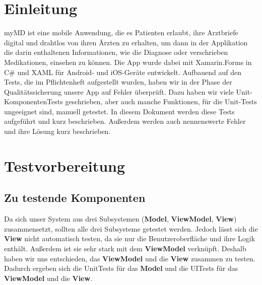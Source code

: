 \documentclass[a4paper]{scrreprt}
\begin{document}
\chapter{Einleitung}
\dq{}myMD\dq{} ist eine mobile Anwendung, die es Patienten erlaubt, ihre Arztbriefe digital und drahtlos von ihren Ärzten zu erhalten, um dann in der Applikation die darin enthaltenen Informationen, wie die Diagnose oder verschrieben Medikationen, einsehen zu können. \newline
\newline
Die App wurde dabei mit Xamarin.Forms in C\# und XAML für Android- und iOS-Geräte entwickelt. 
\newline
\newline
Aufbauend auf den Tests, die im Pflichtenheft aufgestellt wurden, haben wir in der Phase der Qualitätssicherung unsere App auf Fehler überprüft. Dazu haben wir viele Unit-KomponentenTests geschrieben, aber auch manche Funktionen, für die Unit-Tests ungeeignet sind, manuell getestet.
\newline
\newline
In diesem Dokument werden diese Tests aufgeführt und kurz beschrieben. Außerdem werden auch nennenswerte Fehler und ihre Lösung kurz beschrieben.
\chapter{Testvorbereitung}
\section{Zu testende Komponenten}
Da sich unser System aus drei Subsystemen (\textbf{Model}, \textbf{ViewModel}, \textbf{View}) zusammensetzt, sollten alle drei Subsysteme getestet werden. Jedoch lässt sich die \textbf{View} nicht automatisch testen, da sie nur die Benutzeroberfläche und ihre Logik enthält. Außerdem ist sie sehr stark mit dem \textbf{ViewModel} verknüpft. Deshalb haben wir uns entschieden, das \textbf{ViewModel} und die \textbf{View} zusammen zu testen. Dadurch ergeben sich die UnitTests für das \textbf{Model} und die UITests für das \textbf{ViewModel} und die \textbf{View}.
\end{document}
